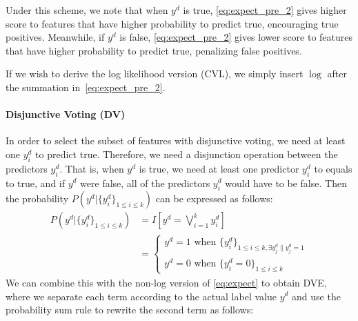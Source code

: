 Under this scheme, we note that when $y^d$ is true,
\eqref{eq:expect_pre_2} gives higher score to features that have
higher probability to predict true, encouraging true positives.
Meanwhile, if $y^d$ is false, \eqref{eq:expect_pre_2} gives lower
score to features that have higher probability to predict true,
penalizing false positives.

If we wish to derive the log likelihood version (CVL), we simply insert
$\log$ after the summation in~\eqref{eq:expect_pre_2}.

\paragraph{Disjunctive Voting (DV)}
In order to select the subset of features with disjunctive voting,
we need at least one $y^d_i$ to predict true. Therefore, we
need a disjunction operation between the predictors $y^d_i$. That is,
when $y^d$ is true, we need at least one predictor $y^d_i$ to equals
to true, and if $y^d$ were false, all of the predictors $y^d_i$ would
have to be false. Then the probability $P\left(y^d|\{y^d_i\}_{1\leq
  i\leq k}\right)$ can be expressed as follows:
{\small 
\begin{align}
P\left(y^d|\{y^d_i\}_{1\leq i\leq k}\right) & =I\left[y^d=\bigvee_{i=1}^k y^d_i\right] \nonumber \\
& = \begin{cases}
	y^d=1 \text{ when } \{y_i^d\}_{1\leq i\leq k,\exists{y_j^d\|y_j^d=1}}\\
	y^d=0 \text{ when } \{y_i^d=0\}_{1\leq i\leq k}
\end{cases}\label{eq:expect_recall_1}
\end{align}}
We can combine this with the non-log version of \eqref{eq:expect} to
obtain DVE, where we  
separate each term according to the
actual label value $y^d$ and use the probability sum rule to rewrite
the second term as follows:
